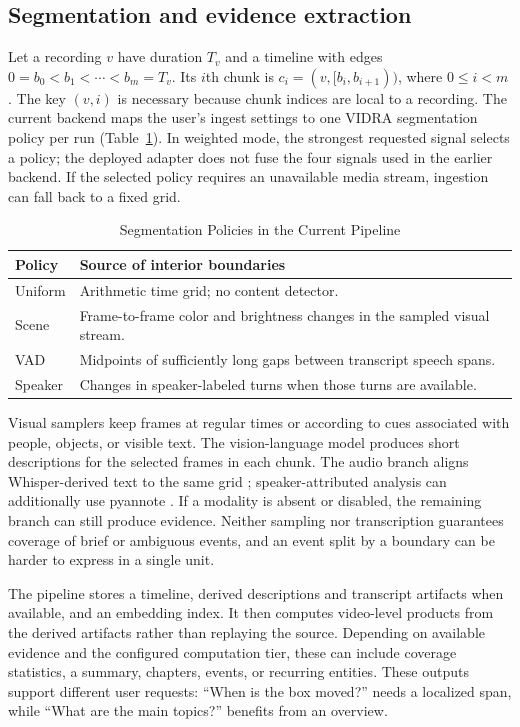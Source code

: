 \documentclass{ieeeaccess}
\begin{document}
\subsection{Segmentation and evidence extraction}
Let a recording $v$ have duration $T_v$ and a timeline with edges $0=b_0<b_1<\cdots<b_m=T_v$. Its $i$th chunk is $c_i=(v,[b_i,b_{i+1}))$, where $0\leq i<m$. The key $(v,i)$ is necessary because chunk indices are local to a recording. The current backend maps the user's ingest settings to one VIDRA segmentation policy per run (Table~\ref{tab:policies}). In weighted mode, the strongest requested signal selects a policy; the deployed adapter does not fuse the four signals used in the earlier backend. If the selected policy requires an unavailable media stream, ingestion can fall back to a fixed grid.

\begin{table}[!t]
\caption{Segmentation Policies in the Current Pipeline}
\label{tab:policies}
\centering
\small
\begin{tabularx}{\columnwidth}{@{}lX@{}}
\toprule
\textbf{Policy} & \textbf{Source of interior boundaries} \\
\midrule
Uniform & Arithmetic time grid; no content detector. \\
Scene & Frame-to-frame color and brightness changes in the sampled visual stream. \\
VAD & Midpoints of sufficiently long gaps between transcript speech spans. \\
Speaker & Changes in speaker-labeled turns when those turns are available. \\
\bottomrule
\end{tabularx}
\end{table}

Visual samplers keep frames at regular times or according to cues associated with people, objects, or visible text. The vision-language model produces short descriptions for the selected frames in each chunk. The audio branch aligns Whisper-derived text to the same grid \cite{whisper}; speaker-attributed analysis can additionally use pyannote \cite{pyannote}. If a modality is absent or disabled, the remaining branch can still produce evidence. Neither sampling nor transcription guarantees coverage of brief or ambiguous events, and an event split by a boundary can be harder to express in a single unit.

The pipeline stores a timeline, derived descriptions and transcript artifacts when available, and an embedding index. It then computes video-level products from the derived artifacts rather than replaying the source. Depending on available evidence and the configured computation tier, these can include coverage statistics, a summary, chapters, events, or recurring entities. These outputs support different user requests: ``When is the box moved?'' needs a localized span, while ``What are the main topics?'' benefits from an overview.
\end{document}
